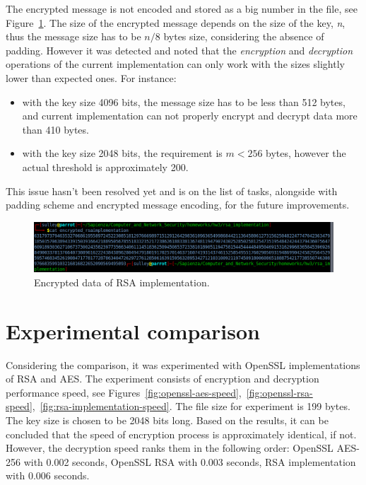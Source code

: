 \documentclass[11 pt]{article}
\begin{document}
The encrypted message is not encoded and stored as a big number in the file, see Figure~\ref{fig:rsa-implementation-encrypted-data}. The size of the encrypted message depends on the size of the key, \textit{n}, thus the message size has to be $n/8$ bytes size, considering the absence of padding. However it was detected and noted that the \textit{encryption} and \textit{decryption} operations of the current implementation can only work with the sizes slightly lower than expected ones. For instance:
\begin{itemize}
	\item with the key size 4096 bits, the message size has to be less than 512 bytes, and current implementation can not properly encrypt and decrypt data more than 410 bytes.
	\item with the key size 2048 bits, the requirement is $m<256$ bytes, however the actual threshold is approximately 200.
\end{itemize}
This issue hasn't been resolved yet and is on the list of tasks, alongside with padding scheme and encrypted message encoding, for the future improvements.

\begin{figure}[H]
    \centering
    \includegraphics[width=1\linewidth]{rsa_implementation_encrypted_data.png}
    \caption{Encrypted data of RSA implementation.}
    \label{fig:rsa-implementation-encrypted-data}
\end{figure}
\newline

\section{Experimental comparison}
Considering the comparison, it was experimented with OpenSSL implementations of RSA and AES. The experiment consists of encryption and decryption performance speed, see Figures~\ref{fig:openssl-aes-speed},~\ref{fig:openssl-rsa-speed},~\ref{fig:rsa-implementation-speed}. The file size for experiment is 199 bytes. The key size is chosen to be 2048 bits long. Based on the results, it can be concluded that the speed of encryption process is approximately identical, if not. However, the decryption speed ranks them in the following order: OpenSSL AES-256 with 0.002 seconds, OpenSSL RSA with 0.003 seconds, RSA implementation with 0.006 seconds.
\end{document}
